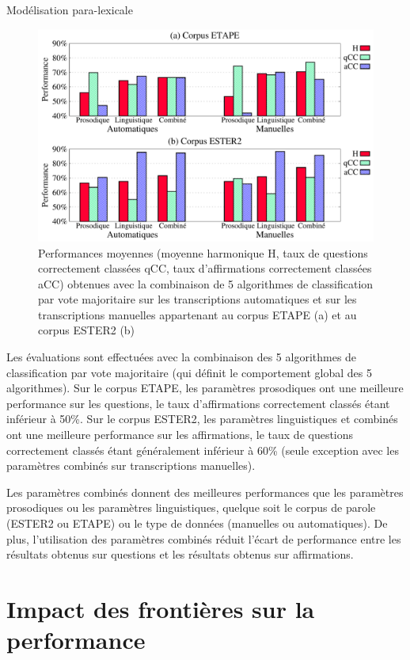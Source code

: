 \documentclass{style/these}
\begin{document}
\begin{part}{Modélisation para-lexicale}
\begin{figure}[h!]
\centering
\includegraphics[scale=0.59]{images/results/compareData_PLC_HQS_EE.pdf}
\caption{Performances moyennes (moyenne harmonique H, taux de questions correctement classées qCC, taux d'affirmations correctement classées aCC) obtenues avec la combinaison de 5 algorithmes de classification par vote majoritaire sur les transcriptions automatiques et sur les transcriptions manuelles appartenant au corpus ETAPE (a) et au corpus ESTER2 (b)}
\label{Fig:ccq-ccS-Ester-Etape}
\end{figure}


Les évaluations sont effectuées avec la combinaison des 5 algorithmes de classification par vote majoritaire (qui définit le comportement global des 5 algorithmes).  
Sur le corpus ETAPE, les paramètres prosodiques ont une meilleure performance sur les questions, le taux d'affirmations correctement classés étant inférieur à 50\%. 
Sur le corpus ESTER2, les paramètres linguistiques et combinés ont une meilleure performance sur les affirmations, le taux de questions correctement classés étant généralement inférieur à 60\% (seule exception avec les paramètres combinés sur transcriptions manuelles). 

Les paramètres combinés donnent des meilleures performances que les paramètres prosodiques ou les paramètres linguistiques, quelque soit le corpus de parole (ESTER2 ou ETAPE) ou le type de données (manuelles ou automatiques). 
De plus, l'utilisation des paramètres combinés réduit l'écart de performance entre les résultats obtenus sur questions et les résultats obtenus sur affirmations.  

\section{Impact des frontières sur la performance}
\renewcommand{\rightmark}{Impact des frontières sur la performance}


\end{part}
\end{document}
